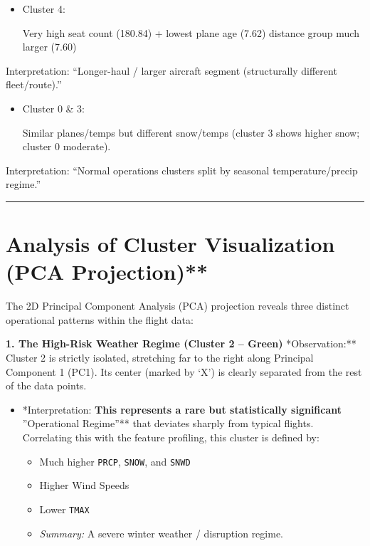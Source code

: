 \documentclass[11pt]{article}
\providecommand{\tightlist}{%
      \setlength{\itemsep}{0pt}\setlength{\parskip}{0pt}}
\begin{document}
\begin{itemize}
\item
  Cluster 4:

  Very high seat count (180.84) + lowest plane age (7.62) distance group
  much larger (7.60)
\end{itemize}

Interpretation: ``Longer-haul / larger aircraft segment (structurally
different fleet/route).''

\begin{itemize}
\item
  Cluster 0 \& 3:

  Similar planes/temps but different snow/temps (cluster 3 shows higher
  snow; cluster 0 moderate).
\end{itemize}

Interpretation: ``Normal operations clusters split by seasonal
temperature/precip regime.''

    

    \begin{center}\rule{0.5\linewidth}{0.5pt}\end{center}

\section{Analysis of Cluster Visualization (PCA
Projection)**}\label{analysis-of-cluster-visualization-pca-projection}

The 2D Principal Component Analysis (PCA) projection reveals three
distinct operational patterns within the flight data:

\textbf{1. The High-Risk Weather Regime (Cluster 2 -- Green)}
*Observation:** Cluster 2 is strictly isolated, stretching far to the
right along Principal Component 1 (PC1). Its center (marked by `X') is
clearly separated from the rest of the data points.

\begin{itemize}
\tightlist
\item
  *Interpretation:\textbf{ This represents a rare but statistically
  significant }''Operational Regime''** that deviates sharply from
  typical flights. Correlating this with the feature profiling, this
  cluster is defined by:

  \begin{itemize}
  \tightlist
  \item
    Much higher \texttt{PRCP}, \texttt{SNOW}, and \texttt{SNWD}
  \item
    Higher Wind Speeds
  \item
    Lower \texttt{TMAX}
  \item
    \emph{Summary:} A severe winter weather / disruption regime.
  \end{itemize}
\end{itemize}
\end{document}
